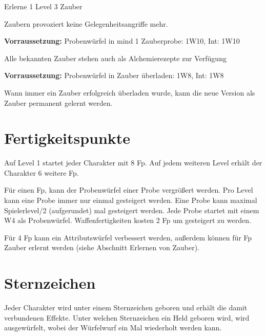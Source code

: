 \documentclass[../../Heldenanleitung2]{subfiles}
\begin{document}
\begin{multicols}{2}
\begin{tcolorbox}[title={Zauberkundig III},colbacktitle=blue, coltitle=white]
   Erlerne 1 Level 3 Zauber
\end{tcolorbox}

\begin{tcolorbox}[title={Kriegszauberer},colbacktitle=blue, coltitle=white]
	Zaubern provoziert keine Gelegenheitsangriffe mehr.
\end{tcolorbox}

\begin{tcolorbox}[title={Magischer Alchemist},colbacktitle=blue, coltitle=white]
	\textbf{Vorraussetzung:} Probenwürfel in mind 1 Zauberprobe: 1W10, Int: 1W10
	\vspace{0.2cm}
	
	Alle bekannten Zauber stehen auch als Alchemierezepte zur Verfügung
\end{tcolorbox}

\begin{tcolorbox}[title={Experimentator},colbacktitle=blue, coltitle=white]
	\textbf{Vorraussetzung:} Probenwürfel in Zauber überladen: 1W8, Int: 1W8
	\vspace{0.2cm}
	
	Wann immer ein Zauber erfolgreich überladen wurde, kann die neue Version als Zauber permanent gelernt werden.
\end{tcolorbox}

\end{multicols}

\section{Fertigkeitspunkte}
Auf Level 1 startet jeder Charakter mit 8 Fp. Auf jedem weiteren Level erhält der Charakter 6 weitere Fp.

Für einen Fp, kann der Probenwürfel einer Probe vergrößert werden. Pro Level kann eine Probe immer nur einmal gesteigert werden. Eine Probe kann maximal Spielerlevel/2 (aufgerundet) mal gesteigert werden. Jede Probe startet mit einem W4 als Probenwürfel. Waffenfertigkeiten kosten 2 Fp um gesteigert zu werden.

Für 4 Fp kann ein Attributswürfel verbessert werden, außerdem können für Fp Zauber erlernt werden (siehe Abschnitt Erlernen von Zauber).

\section{Sternzeichen}
Jeder Charakter wird unter einem Sternzeichen geboren und erhält die damit verbundenen Effekte. Unter welchen Sternzeichen ein Held geboren wird, wird ausgewürfelt, wobei der Würfelwurf ein Mal wiederholt werden kann.
\end{document}
